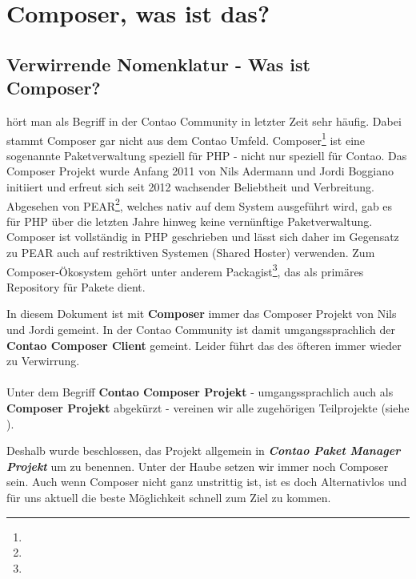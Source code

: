\documentclass[
paper=a4,
draft=false,%
fontsize=10pt%
]{scrartcl}
\newcommand{\contaoPackageManagerProject}{\textbf{\textit{Contao Paket Manager Projekt}}}
\begin{document}
\pagebreak
\tableofcontents
\pagebreak

%
%

\section{Composer, was ist das?}
\label{sec:why-composer}

\subsection{Verwirrende Nomenklatur - Was ist Composer?}

 hört man als Begriff in der Contao Community in letzter Zeit sehr häufig. Dabei stammt Composer gar nicht aus dem Contao Umfeld. Composer\footnote{} ist eine sogenannte Paketverwaltung speziell für PHP - nicht nur speziell für Contao. Das Composer Projekt wurde Anfang 2011 von Nils Adermann und Jordi Boggiano initiiert und erfreut sich seit 2012 wachsender Beliebtheit und Verbreitung. Abgesehen von PEAR\footnote{}, welches nativ auf dem System ausgeführt wird, gab es für PHP über die letzten Jahre hinweg keine vernünftige Paketverwaltung. Composer ist vollständig in PHP geschrieben und lässt sich daher im Gegensatz zu PEAR auch auf restriktiven Systemen (Shared Hoster) verwenden. Zum Composer-Ökosystem gehört unter anderem Packagist\footnote{}, das als primäres Repository für Pakete dient.

\begin{info}
In diesem Dokument ist mit \textbf{Composer} immer das Composer Projekt von Nils und Jordi gemeint.
In der Contao Community ist damit umgangssprachlich der \textbf{Contao Composer Client} gemeint.
Leider führt das des öfteren immer wieder zu Verwirrung. \\
\\
Unter dem Begriff \textbf{Contao Composer Projekt} - umgangssprachlich auch als \textbf{Composer Projekt} abgekürzt - vereinen wir alle zugehörigen Teilprojekte (siehe ).
\end{info}

Deshalb wurde beschlossen, das Projekt allgemein in \contaoPackageManagerProject{} um zu benennen. Unter der Haube setzen wir immer noch Composer sein. Auch wenn Composer nicht ganz unstrittig ist, ist es doch Alternativlos und für uns aktuell die beste Möglichkeit schnell zum Ziel zu kommen.
\end{document}

